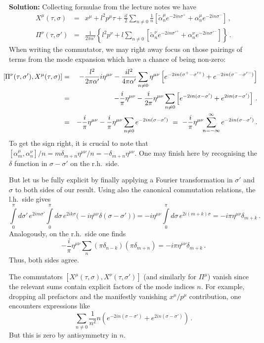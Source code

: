 \documentclass[12pt]{article}
\newcommand{\be}{\begin{equation}}
\newcommand{\ee}{\end{equation}}
\newcommand{\bea}{\begin{eqnarray}}
\newcommand{\eea}{\end{eqnarray}}
\numberwithin{equation}{section}
\begin{document}
\noindent
{\bf Solution:} Collecting formulae from the lecture notes we have
\bea
X^\mu(\tau,\sigma) &=& x^\mu+l^2p^\mu\tau+\frac{il}{2}\sum_{n\neq 0}\frac{1}{n}\left[ \tilde{\alpha}_n^\mu e^{-2 in\sigma^+} +\alpha _n^\mu e^{-2 in\sigma^-}\right] \,,
\\
\Pi^\nu(\tau,\sigma') &=& \frac{1}{2\pi\alpha'}\left\{l^2p^\nu + l \sum_{n\neq 0} \left[ \tilde{\alpha}_n^\nu e^{-2 in\sigma'^+} +\alpha_n^\nu e^{-2 in\sigma'^-}\right]\right\}\,.
\eea
When writing the commutator, we may right away focus on those pairings of terms from the mode expansion which have a chance of being non-zero:
\bea
\hspace*{-.3cm}[\Pi^\nu(\tau,\sigma'),X^\mu(\tau,\sigma)] &=& -\frac{l^2}{2\pi\alpha'}i\eta^{\mu\nu}-\frac{il^2}{4\pi \alpha'}\sum_{n\neq 0}\eta^{\mu\nu}\left[e^{-2 i n(\sigma^+ - \sigma'^+)} + e^{-2 i n(\sigma^- - \sigma'^-)} \right]
\nonumber
\\
&=& -\frac{i}{\pi}\eta^{\mu\nu} - \frac{i}{2\pi}\eta^{\mu\nu}\sum_{n\neq 0}\left[ e^{-2 i n(\sigma - \sigma')} + e^{2 i n(\sigma - \sigma')}
\right]\,.
\nonumber
\\
&=& -\frac{i}{\pi}\eta^{\mu\nu} - \frac{i}{\pi}\eta^{\mu\nu}\sum_{n\neq 0} e^{-2 i n(\sigma - \sigma')} \,\,=\,\,-\frac{i}{\pi}\eta^{\mu\nu}\!\!\sum_{n=-\infty}^{\infty}e^{-2 i n(\sigma - \sigma')}\,.
\eea
To get the sign right, it is crucial to note that $[\alpha_m^\mu,\alpha_n^\nu]/n=
m\delta_{m+n}\eta^{\mu\nu}/n=-\delta_{m+n}\eta^{\mu\nu}$. One may finish here by recognising the $\delta$ function in $\sigma-\sigma'$ on the r.h.~side.

But let us be fully explicit by finally applying a Fourier transformation in $\sigma'$ and $\sigma$ to both sides of our result. Using also the canonical commutation relations, the l.h.~side gives
\be
\int\limits_{0}^{\pi}d\sigma'\, e^{2 im\sigma'}
\int\limits_{0}^{\pi}d\sigma\, e^{2 ik\sigma}\big( -i\eta^{\mu\nu}\delta(\sigma-\sigma')\big)= -i\eta^{\mu\nu} 
\int\limits_{0}^{\pi}d\sigma\, e^{2 i(m+k)\sigma}
=-i\pi\eta^{\mu\nu}\delta_{m+k}\,.
\ee
Analogously, on the r.h.~side one finds
\be
-\frac{i}{\pi}\eta^{\mu\nu}\sum_n (\pi\delta_{n-k})(\pi\delta_{m+n}) = 
-i\pi \eta^{\mu\nu}\delta_{m+k}\,.
\ee
Thus, both sides agree.

The commutators $[X^\mu(\tau,\sigma),X^\nu(\tau,\sigma')]$ (and similarly for $\Pi^\mu$) vanish since the relevant sums contain explicit factors of the mode indices $n$. For example, dropping all prefactors and the manifestly vanishing $x^\mu/p^\mu$ contribution, one encounters expressions like
\be
\sum_{n\neq 0} \frac{1}{n^2} n \left(e^{-2in(\sigma-\sigma')}
+ e^{2in(\sigma-\sigma')}\right)\,.
\ee
But this is zero by antisymmetry in $n$. 
\end{document}
